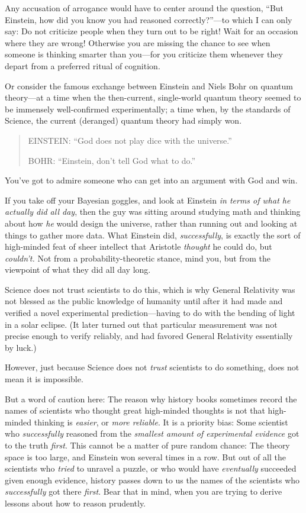 {
 Any accusation of arrogance would have to center around the
question, ``But Einstein, how did you know you had
reasoned correctly?''---to which I can only say: Do
not criticize people when they turn out to be right! Wait for an
occasion where they are wrong! Otherwise you are missing the chance to
see when someone is thinking smarter than you---for you criticize them
whenever they depart from a preferred ritual of cognition.}

{
 Or consider the famous exchange between Einstein and Niels Bohr on
quantum theory---at a time when the then-current, single-world quantum
theory seemed to be immensely well-confirmed experimentally; a time
when, by the standards of Science, the current (deranged) quantum
theory had simply won.}

\begin{quotation}
{
 EINSTEIN: ``God does not play dice with the
universe.''}

{
 BOHR: ``Einstein, don't tell God
 what to do.''}
\end{quotation}

{
 You've got to admire someone who can get into an
argument with God and win.}

{
 If you take off your Bayesian goggles, and look at Einstein
\textit{in terms of what he actually did all day}, then the guy was
sitting around studying math and thinking about how \textit{he} would
design the universe, rather than running out and looking at things to
gather more data. What Einstein did, \textit{successfully}, is exactly
the sort of high-minded feat of sheer intellect that Aristotle
\textit{thought} he could do, but \textit{couldn't.}
Not from a probability-theoretic stance, mind you, but from the
viewpoint of what they did all day long.}

{
 Science does not trust scientists to do this, which is why General
Relativity was not blessed as the public knowledge of humanity until
after it had made and verified a novel experimental prediction---having
to do with the bending of light in a solar eclipse. (It later turned
out that particular measurement was not precise enough to verify
reliably, and had favored General Relativity essentially by luck.)}

{
 However, just because Science does not \textit{trust} scientists
to do something, does not mean it is impossible.}

{
 But a word of caution here: The reason why history books sometimes
record the names of scientists who thought great high-minded thoughts
is not that high-minded thinking is \textit{easier}, or \textit{more
reliable}. It is a priority bias: Some scientist who
\textit{successfully} reasoned from the \textit{smallest amount of
experimental evidence} got to the truth \textit{first}. This cannot be
a matter of pure random chance: The theory space is too large, and
Einstein won several times in a row. But out of all the scientists who
\textit{tried} to unravel a puzzle, or who would have
\textit{eventually} succeeded given enough evidence, history passes
down to us the names of the scientists who \textit{successfully} got
there \textit{first}. Bear that in mind, when you are trying to derive
lessons about how to reason prudently.}

